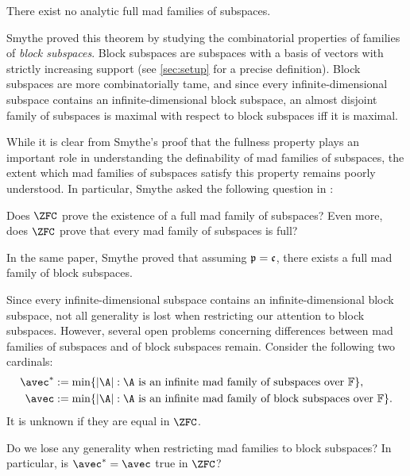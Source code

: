 \documentclass[11pt,reqno]{amsart}
\begin{document}
\begin{theorem}
\label{thm:mad.not.analytic}
    There exist no analytic full mad families of subspaces.
\end{theorem}

Smythe proved this theorem by studying the combinatorial properties of families of \emph{block subspaces}. Block subspaces are subspaces with a basis of vectors with strictly increasing support (see \Sec\ref{sec:setup} for a precise definition). Block subspaces are more combinatorially tame, and since every infinite-dimensional subspace contains an infinite-dimensional block subspace, an almost disjoint family of subspaces is maximal with respect to block subspaces iff it is maximal. 

While it is clear from Smythe's proof that the fullness property plays an important role in understanding the definability of mad families of subspaces, the extent which mad families of subspaces satisfy this property remains poorly understood. In particular, Smythe asked the following question in \cite{S19}:

\begin{prob}
\label{prob:full.mad.families}
    Does $\ZFC$ prove the existence of a full mad family of subspaces? Even more, does $\ZFC$ prove that every mad family of subspaces is full?
\end{prob}

In the same paper, Smythe proved that assuming $\frak{p} = \frak{c}$, there exists a full mad family of block subspaces.

Since every infinite-dimensional subspace contains an infinite-dimensional block subspace, not all generality is lost when restricting our attention to block subspaces. However, several open problems concerning differences between mad families of subspaces and of block subspaces remain. Consider the following two cardinals:
\begin{align*}
    \avec^* &:= \min\{|\A| : \text{$\A$ is an infinite mad family of subspaces over $\mathbb{F}$}\}, \\
    \avec &:= \min\{|\A| : \text{$\A$ is an infinite mad family of block subspaces over $\mathbb{F}$}\}.
\end{align*}
It is unknown if they are equal in $\ZFC$.

\begin{prob}
\label{prob:avec*.and.avec}
    Do we lose any generality when restricting mad families to block subspaces? In particular, is $\avec^* = \avec$ true in $\ZFC$?
\end{prob}
\end{document}
